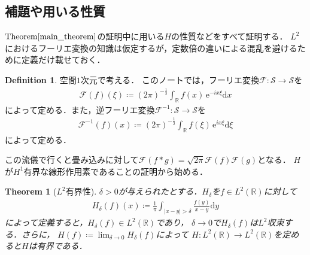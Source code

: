 \documentclass[dvipdfmx,autodetect-engine]{jsarticle}
\newtheorem{theorem}{Theorem}[section]
\theoremstyle{remark}
\theoremstyle{definition}
\newtheorem{definition}{Definition}[section]
\newcommand{\R}{\mathbb{R}}
\begin{document}
\subsection{補題や用いる性質}
$\mathrm{Theorem} \ref{main_theorem}$の証明中に用いる$H$の性質などをすべて証明する．
$L^2$におけるフーリエ変換の知識は仮定するが，定数倍の違いによる混乱を避けるために定義だけ載せておく．
\begin{definition}
    空間$1$次元で考える．
    このノートでは，フーリエ変換$\mathcal{F} :\mathcal{S} \to \mathcal{S}$を
    \begin{align}
        \mathcal{F}(f)(\xi) \coloneqq (2\pi)^{-\frac{1}{2}} \int_{\R} f(x)\, \mathrm{e}^{-ix\xi} \mathrm{d}x
    \end{align}
    によって定める．また，逆フーリエ変換$\mathcal{F}^{-1} :\mathcal{S} \to \mathcal{S}$を
    \begin{align}
        \mathcal{F}^{-1} (f)(x) \coloneqq (2\pi)^{-\frac{1}{2}} \int_{\R} f(\xi)\, \mathrm{e}^{ix\xi} \mathrm{d}\xi
    \end{align}
    によって定める．
\end{definition}

この流儀で行くと畳み込みに対して$\mathcal{F}(f\ast g) = \sqrt{2\pi} \mathcal{F}(f) \mathcal{F}(g)$となる．
$H$が$H^1$有界な線形作用素であることの証明から始める．
\begin{theorem}[$L^2$有界性]
    $\delta >0$が与えられたとする．$H_{\delta}$を$f \in L^2 (\R)$に対して
    \begin{align}
        H_{\delta} (f) (x) \coloneqq \frac{1}{\pi} \int_{\lvert x-y \rvert > \delta} 
        \frac{f(y)}{x-y} \mathrm{d}y
    \end{align}
    によって定義すると，$H_{\delta}(f) \in L^2(\R)$であり，
    $\delta \to 0$で$H_{\delta}(f)$は$L^2$収束する．さらに，
    $H(f) \coloneqq \lim_{\delta \to 0} H_{\delta} (f)$によって
    $H:L^2(\R) \to L^2(\R)$を定めると$H$は有界である．
\end{theorem}
\end{document}
